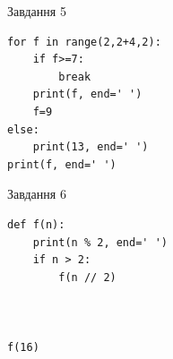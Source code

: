 \documentclass[12pt, ukrainian]{article}
\begin{document}
{\vspace{15mm}
\begin{minipage}[t]{9.7cm}                
{\begin{center}Завдання {5}\end{center}}
\begin{verbatim}
for f in range(2,2+4,2):
    if f>=7:
        break
    print(f, end=' ')
    f=9
else:
    print(13, end=' ')
print(f, end=' ')
\end{verbatim}     
\end{minipage}
\vline \hspace{8mm}
\begin{minipage}[t]{8.0cm}                
{\begin{center}Завдання {6}\end{center}}
\begin{verbatim}
def f(n):
    print(n % 2, end=' ')
    if n > 2:
        f(n // 2)
    


f(16)
\end{verbatim}     
\end{minipage}

}
\newpage
\end{document}
